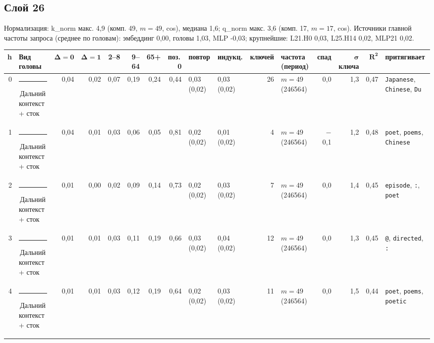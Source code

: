 \documentclass[10pt]{article}
\begin{document}
\noindent\begin{minipage}{\linewidth}
\subsection*{Слой 26}
{\small\color{ink2} Нормализация: k\_norm макс. 4,9 (комп. 49, $m{=}49$, cos), медиана 1,6; q\_norm макс. 3,6 (комп. 17, $m{=}17$, cos). Источники главной частоты запроса (среднее по головам): эмбеддинг 0,00, головы 1,03, MLP -0,03; крупнейшие: L21.H0 0,03, L25.H14 0,02, MLP21 0,02.}
\begin{center}{\footnotesize\begin{tabular}{|r|l|r|r|r|r|r|r|l|l|r|l|r|r|r|l|}
\hline
\rowcolor{head}\textbf{h} & \textbf{Вид головы} & $\boldsymbol{\Delta{=}0}$ & $\boldsymbol{\Delta{=}1}$ & \textbf{2–8} & \textbf{9–64} & \textbf{65+} & \textbf{поз.\,0} & \textbf{повтор} & \textbf{индукц.} & \textbf{ключей} & \textbf{частота (период)} & \textbf{спад} & $\boldsymbol{\sigma}$ \textbf{ключа} & $\boldsymbol{R^2}$ & \textbf{притягивает} \\ \hline
0 & \textcolor[HTML]{C3C2B7}{\rule{0.62em}{0.62em}}\,Дальний контекст + сток & 0,04 & 0,02 & 0,07 & 0,19 & 0,24 & 0,44 & 0,03 (0,02) & 0,03 (0,02) & 26 & $m{=}49$ (246564) & 0,0 & 1,3 & 0,47 & \texttt{\textvisiblespace{}Japanese}, \texttt{\textvisiblespace{}Chinese}, \texttt{\textvisiblespace{}Du} \\ \hline
1 & \textcolor[HTML]{C3C2B7}{\rule{0.62em}{0.62em}}\,Дальний контекст + сток & 0,04 & 0,01 & 0,03 & 0,06 & 0,05 & 0,81 & 0,02 (0,02) & 0,01 (0,02) & 4 & $m{=}49$ (246564) & $-$0,1 & 1,2 & 0,48 & \texttt{\textvisiblespace{}poet}, \texttt{\textvisiblespace{}poems}, \texttt{\textvisiblespace{}Chinese} \\ \hline
2 & \textcolor[HTML]{C3C2B7}{\rule{0.62em}{0.62em}}\,Дальний контекст + сток & 0,01 & 0,00 & 0,02 & 0,09 & 0,14 & 0,73 & 0,02 (0,02) & 0,03 (0,02) & 7 & $m{=}49$ (246564) & 0,0 & 1,4 & 0,45 & \texttt{\textvisiblespace{}episode}, \texttt{\textvisiblespace{}:}, \texttt{\textvisiblespace{}poet} \\ \hline
3 & \textcolor[HTML]{C3C2B7}{\rule{0.62em}{0.62em}}\,Дальний контекст + сток & 0,01 & 0,01 & 0,03 & 0,11 & 0,19 & 0,66 & 0,03 (0,02) & 0,04 (0,02) & 12 & $m{=}49$ (246564) & 0,0 & 1,3 & 0,45 & \texttt{\textvisiblespace{}@}, \texttt{\textvisiblespace{}directed}, \texttt{\textvisiblespace{}:} \\ \hline
4 & \textcolor[HTML]{C3C2B7}{\rule{0.62em}{0.62em}}\,Дальний контекст + сток & 0,01 & 0,01 & 0,03 & 0,12 & 0,19 & 0,64 & 0,02 (0,02) & 0,03 (0,02) & 11 & $m{=}49$ (246564) & 0,0 & 1,5 & 0,44 & \texttt{\textvisiblespace{}poet}, \texttt{\textvisiblespace{}poems}, \texttt{\textvisiblespace{}poetic} \\ \hline

\end{tabular}}
\end{center}
\end{minipage}
\end{document}
